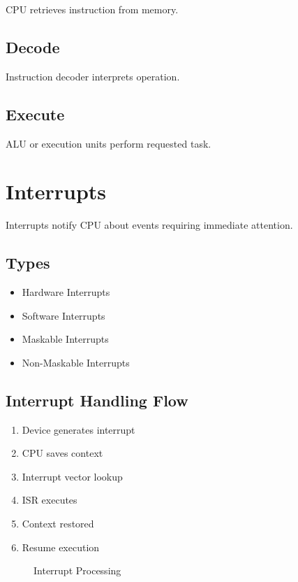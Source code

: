 CPU retrieves instruction from memory.

\subsection{Decode}

Instruction decoder interprets operation.

\subsection{Execute}

ALU or execution units perform requested task.

\section{Interrupts}

Interrupts notify CPU about events requiring immediate attention.

\subsection{Types}

\begin{itemize}
\item Hardware Interrupts
\item Software Interrupts
\item Maskable Interrupts
\item Non-Maskable Interrupts
\end{itemize}

\subsection{Interrupt Handling Flow}

\begin{enumerate}
\item Device generates interrupt
\item CPU saves context
\item Interrupt vector lookup
\item ISR executes
\item Context restored
\item Resume execution
\end{enumerate}

\begin{figure}[H]
\centering
{}
\caption{Interrupt Processing}
\end{figure}


